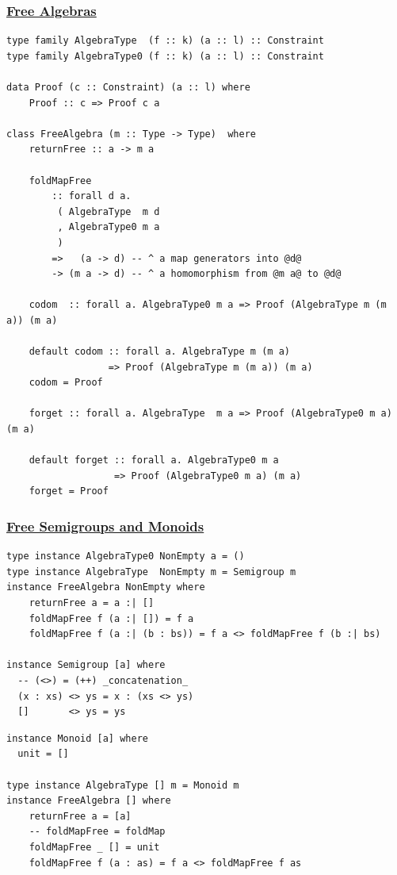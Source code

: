 \documentclass[t,dvipsnames]{beamer}
\begin{document}
\begin{frame}[fragile]
    \frametitle{\underline{Free Algebras}}
    \begin{verbatim}
type family AlgebraType  (f :: k) (a :: l) :: Constraint
type family AlgebraType0 (f :: k) (a :: l) :: Constraint

data Proof (c :: Constraint) (a :: l) where
    Proof :: c => Proof c a

class FreeAlgebra (m :: Type -> Type)  where
    returnFree :: a -> m a

    foldMapFree
        :: forall d a.
         ( AlgebraType  m d
         , AlgebraType0 m a
         )
        =>   (a -> d) -- ^ a map generators into @d@
        -> (m a -> d) -- ^ a homomorphism from @m a@ to @d@

    codom  :: forall a. AlgebraType0 m a => Proof (AlgebraType m (m a)) (m a)

    default codom :: forall a. AlgebraType m (m a)
                  => Proof (AlgebraType m (m a)) (m a)
    codom = Proof

    forget :: forall a. AlgebraType  m a => Proof (AlgebraType0 m a) (m a)

    default forget :: forall a. AlgebraType0 m a
                   => Proof (AlgebraType0 m a) (m a)
    forget = Proof

    \end{verbatim}
\end{frame}

\begin{frame}[fragile]
    \frametitle{\underline{Free Semigroups and Monoids}}
    \begin{verbatim}
type instance AlgebraType0 NonEmpty a = ()
type instance AlgebraType  NonEmpty m = Semigroup m
instance FreeAlgebra NonEmpty where
    returnFree a = a :| []
    foldMapFree f (a :| []) = f a
    foldMapFree f (a :| (b : bs)) = f a <> foldMapFree f (b :| bs)

instance Semigroup [a] where
  -- (<>) = (++) _concatenation_
  (x : xs) <> ys = x : (xs <> ys)
  []       <> ys = ys
    \end{verbatim}

    \begin{verbatim}
instance Monoid [a] where
  unit = []

type instance AlgebraType [] m = Monoid m
instance FreeAlgebra [] where
    returnFree a = [a]
    -- foldMapFree = foldMap
    foldMapFree _ [] = unit
    foldMapFree f (a : as) = f a <> foldMapFree f as

    \end{verbatim}
\end{frame}
\end{document}
